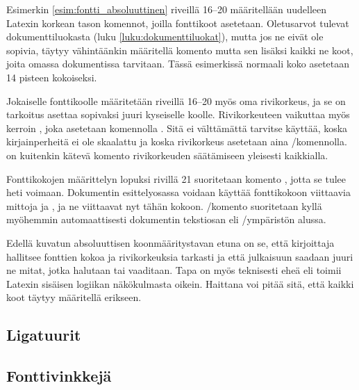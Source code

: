 \begin{koodilohkosis}
  \sffamilyabs\fontsize{16bp}{18bp}\bfseries
\end{koodilohkosis}

Esimerkin \ref{esim:fontti_absoluuttinen} riveillä 16--20 määritellään
uudelleen Latexin korkean tason komennot, joilla fonttikoot asetetaan.
Oletus\-arvot tulevat dokumenttiluokasta (luku
\ref{luku:dokumenttiluokat}), mutta jos ne eivät ole sopivia, täytyy
vähintäänkin määritellä komento  mutta sen
lisäksi kaikki ne koot, joita omassa dokumentissa tarvitaan. Tässä
esimerkissä normaali koko asetetaan 14 pisteen kokoiseksi.

Jokaiselle fonttikoolle määritetään riveillä 16--20 myös oma
rivikorkeus, ja se on tarkoitus asettaa sopivaksi juuri kyseiselle
koolle. Rivikorkeuteen vaikuttaa myös kerroin , joka asetetaan komennolla .
Sitä ei välttämättä tarvitse käyttää, koska kirjainperheitä ei ole
skaalattu ja koska rivikorkeus asetetaan aina \-/komennolla.  on kuitenkin kätevä
komento rivikorkeuden säätämiseen yleisesti kaikkialla.

Fonttikokojen määrittelyn lopuksi rivillä 21 suoritetaan komento
, jotta se tulee heti voimaan. Dokumentin
esittelyosassa voidaan käyttää fonttikokoon viittaavia mittoja
 ja , ja ne viittaavat nyt tähän kokoon.
\-/komento suoritetaan kyllä myöhemmin
automaattisesti dokumentin tekstiosan eli \-/ympäristön
alussa.

Edellä kuvatun absoluuttisen koonmääritystavan etuna on se, että
kirjoittaja hallitsee fonttien kokoa ja rivikorkeuksia tarkasti ja että
julkaisuun saadaan juuri ne mitat, jotka halutaan tai vaaditaan. Tapa on
myös teknisesti eheä eli toimii Latexin sisäisen logiikan näkökulmasta
oikein. Haittana voi pitää sitä, että kaikki koot täytyy määritellä
erikseen.

\subsection{Ligatuurit}


\subsection{Fonttivinkkejä}

